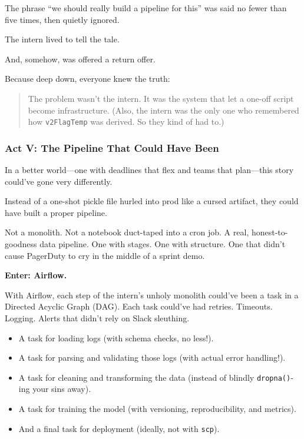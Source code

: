 The phrase “we should really build a pipeline for this” was said no fewer than five times, then quietly ignored.

The intern lived to tell the tale.

And, somehow, was offered a return offer.

Because deep down, everyone knew the truth:

\begin{quote}
The problem wasn’t the intern.  It was the system that let a one-off script become infrastructure.  (Also, the intern was the only one who remembered how \texttt{v2FlagTemp} was derived. So they kind of had to.)
\end{quote}

\subsubsection{Act V: The Pipeline That Could Have Been}

In a better world—one with deadlines that flex and teams that plan—this story could’ve gone very differently.

Instead of a one-shot pickle file hurled into prod like a cursed artifact, they could have built a proper pipeline.

Not a monolith. Not a notebook duct-taped into a cron job. A real, honest-to-goodness data pipeline. One with stages. One with structure. One that didn’t cause PagerDuty to cry in the middle of a sprint demo.

\textbf{Enter: Airflow.}

With Airflow, each step of the intern’s unholy monolith could’ve been a task in a Directed Acyclic Graph (DAG). Each task could’ve had retries. Timeouts. Logging. Alerts that didn’t rely on Slack sleuthing.

\begin{itemize}
  \item A task for loading logs (with schema checks, no less!).
  \item A task for parsing and validating those logs (with actual error handling!).
  \item A task for cleaning and transforming the data (instead of blindly \texttt{dropna()}-ing your sins away).
  \item A task for training the model (with versioning, reproducibility, and metrics).
  \item And a final task for deployment (ideally, not with \texttt{scp}).
\end{itemize}

